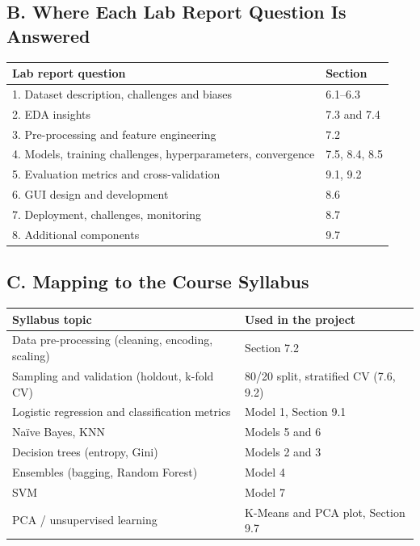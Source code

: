 \documentclass[11pt,a4paper]{article}
\begin{document}
\subsection*{B. Where Each Lab Report Question Is Answered}
\begin{table}[H]
\centering
\begin{tabular}{lp{3.5cm}}
\toprule
\textbf{Lab report question} & \textbf{Section} \\
\midrule
1. Dataset description, challenges and biases & 6.1--6.3 \\
2. EDA insights & 7.3 and 7.4 \\
3. Pre-processing and feature engineering & 7.2 \\
4. Models, training challenges, hyperparameters, convergence & 7.5, 8.4, 8.5 \\
5. Evaluation metrics and cross-validation & 9.1, 9.2 \\
6. GUI design and development & 8.6 \\
7. Deployment, challenges, monitoring & 8.7 \\
8. Additional components & 9.7 \\
\bottomrule
\end{tabular}
\end{table}

\subsection*{C. Mapping to the Course Syllabus}
\begin{table}[H]
\centering
\begin{tabular}{ll}
\toprule
\textbf{Syllabus topic} & \textbf{Used in the project} \\
\midrule
Data pre-processing (cleaning, encoding, scaling) & Section 7.2 \\
Sampling and validation (holdout, k-fold CV) & 80/20 split, stratified CV (7.6, 9.2) \\
Logistic regression and classification metrics & Model 1, Section 9.1 \\
Na\"ive Bayes, KNN & Models 5 and 6 \\
Decision trees (entropy, Gini) & Models 2 and 3 \\
Ensembles (bagging, Random Forest) & Model 4 \\
SVM & Model 7 \\
PCA / unsupervised learning & K-Means and PCA plot, Section 9.7 \\
\bottomrule
\end{tabular}
\end{table}
\end{document}
